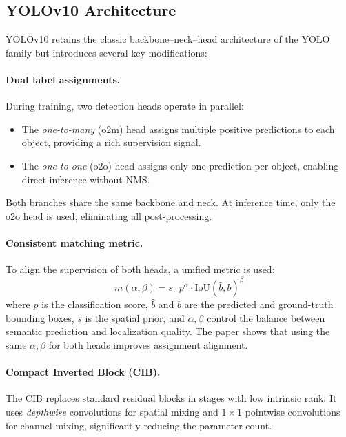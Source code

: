\documentclass[11pt,a4paper]{article}
\begin{document}
\subsection{YOLOv10 Architecture}

YOLOv10 retains the classic backbone--neck--head architecture of the YOLO family but introduces several key modifications:

\paragraph{Dual label assignments.}
During training, two detection heads operate in parallel:
\begin{itemize}[noitemsep]
  \item The \emph{one-to-many} (o2m) head assigns multiple positive predictions to each object, providing a rich supervision signal.
  \item The \emph{one-to-one} (o2o) head assigns only one prediction per object, enabling direct inference without NMS.
\end{itemize}
Both branches share the same backbone and neck. At inference time, only the o2o head is used, eliminating all post-processing.

\paragraph{Consistent matching metric.}
To align the supervision of both heads, a unified metric is used:
\begin{equation}
  m(\alpha, \beta) = s \cdot p^{\alpha} \cdot \text{IoU}(\hat{b}, b)^{\beta}
  \label{eq:metric}
\end{equation}
where $p$ is the classification score, $\hat{b}$ and $b$ are the predicted and ground-truth bounding boxes, $s$ is the spatial prior, and $\alpha, \beta$ control the balance between semantic prediction and localization quality. The paper shows that using the same $\alpha, \beta$ for both heads improves assignment alignment.

\paragraph{Compact Inverted Block (CIB).}
The CIB replaces standard residual blocks in stages with low intrinsic rank. It uses \emph{depthwise} convolutions for spatial mixing and $1\!\times\!1$ pointwise convolutions for channel mixing, significantly reducing the parameter count.
\end{document}
